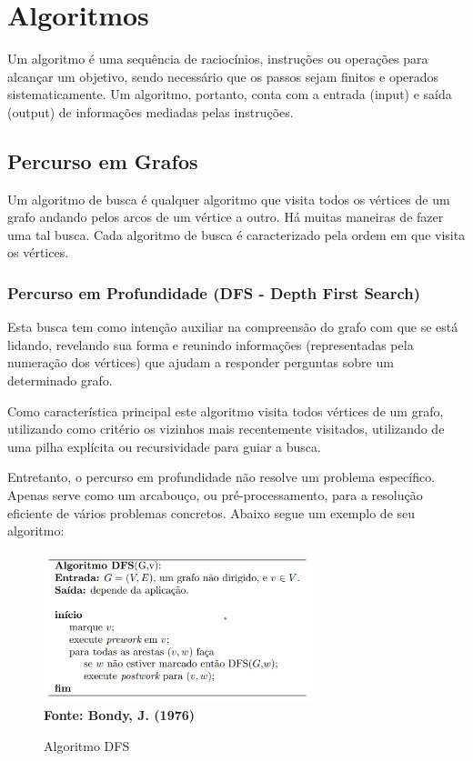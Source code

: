 \section{\esp Algoritmos}

Um algoritmo é uma sequência de raciocínios, instruções ou operações para alcançar um objetivo, sendo necessário que os passos sejam finitos e operados sistematicamente. Um algoritmo, portanto, conta com a entrada (input) e saída (output) de informações mediadas pelas instruções.

\subsection{\esp Percurso em Grafos}

Um algoritmo de busca é qualquer algoritmo que visita todos os vértices de um grafo andando pelos arcos de um vértice a outro. Há muitas maneiras de fazer uma tal busca. Cada algoritmo de busca é caracterizado pela ordem em que visita os vértices.

\subsubsection{\esp Percurso em Profundidade (DFS - Depth First Search)}

Esta busca tem como intenção auxiliar na compreensão do grafo com que se está lidando, revelando sua forma e reunindo informações (representadas pela numeração dos vértices) que ajudam a responder perguntas sobre um determinado grafo.

Como característica principal este algoritmo visita todos vértices de um grafo, utilizando como critério os vizinhos mais recentemente visitados, utilizando de uma pilha explícita ou recursividade para guiar a busca.

Entretanto, o percurso em profundidade não resolve um problema específico. Apenas  serve como um arcabouço, ou pré-processamento, para a resolução eficiente de vários problemas concretos. Abaixo segue um exemplo de seu algoritmo:

\begin{figure}[ht]
	\centering	
	\caption[\hspace{0.1cm}Algoritmo DFS.]{Algoritmo DFS}
	\vspace{-0.4cm}
	\includegraphics[width=0.7\textwidth]{figuras/dfs.png}
	 \vspace{-0.2cm}
	\\\textbf{\footnotesize Fonte:  Bondy, J. (1976)}
	\label{fig:figura1}
\end{figure}

